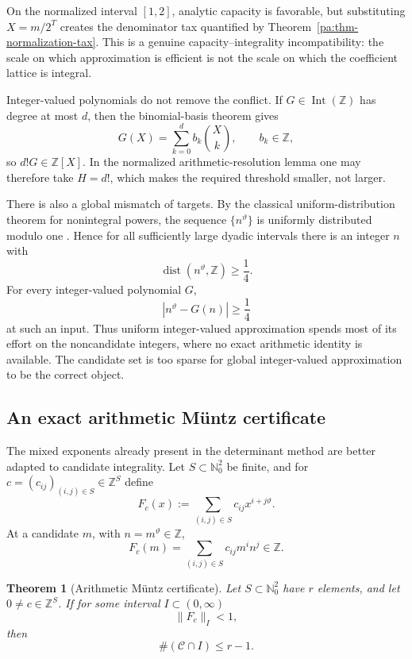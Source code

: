 \documentclass[11pt,oneside]{article}
\newtheorem{theorem}{Theorem}[section]
\theoremstyle{definition}
\theoremstyle{remark}
\newcommand{\Nzero}{\mathbb N_0}
\newcommand{\Z}{\mathbb Z}
\newcommand{\thetaq}{\vartheta}
\newcommand{\Cand}{\mathcal C}
\begin{document}
On the normalized interval \([1,2]\), analytic capacity is favorable, but substituting
\(X=m/2^T\) creates the denominator tax quantified by
Theorem~\ref{pa:thm-normalization-tax}.  This is a genuine capacity--integrality
incompatibility: the scale on which approximation is efficient is not the scale on which the
coefficient lattice is integral.

Integer-valued polynomials do not remove the conflict.  If
\(G\in\operatorname{Int}(\Z)\) has degree at most \(d\), then the binomial-basis theorem gives
\begin{equation}
 G(X)=\sum_{k=0}^{d}b_k\binom{X}{k},
 \qquad b_k\in\Z,
 \label{pa:eq-intZ-binomial}
\end{equation}
so \(d!G\in\Z[X]\).  In the normalized arithmetic-resolution lemma one may therefore take
\(H=d!\), which makes the required threshold smaller, not larger.

There is also a global mismatch of targets.  By the classical uniform-distribution theorem
for nonintegral powers, the sequence \(\{n^{\thetaq}\}\) is uniformly distributed modulo one
\cite{KuipersNiederreiter}.  Hence for all sufficiently large dyadic intervals there is an
integer \(n\) with
\[
 \operatorname{dist}(n^{\thetaq},\Z)\ge\frac14.
\]
For every integer-valued polynomial \(G\),
\[
 |n^{\thetaq}-G(n)|\ge\frac14
\]
at such an input.  Thus uniform integer-valued approximation spends most of its effort on the
noncandidate integers, where no exact arithmetic identity is available.  The candidate set is
too sparse for global integer-valued approximation to be the correct object.

\subsection{An exact arithmetic M\"untz certificate}

The mixed exponents already present in the determinant method are better adapted to candidate
integrality.  Let \(S\subset\Nzero^2\) be finite, and for
\(c=(c_{ij})_{(i,j)\in S}\in\Z^S\) define
\begin{equation}
 F_c(x):=\sum_{(i,j)\in S}c_{ij}x^{i+j\thetaq}.
 \label{pa:eq-muntz-polynomial}
\end{equation}
At a candidate \(m\), with \(n=m^{\thetaq}\in\Z\),
\begin{equation}
 F_c(m)=\sum_{(i,j)\in S}c_{ij}m^in^j\in\Z.
 \label{pa:eq-muntz-integrality}
\end{equation}

\begin{theorem}[Arithmetic M\"untz certificate]
\label{pa:thm-muntz-certificate}
Let \(S\subset\Nzero^2\) have \(r\) elements, and let
\(0\ne c\in\Z^S\).  If for some interval \(I\subset(0,\infty)\)
\begin{equation}
 \|F_c\|_I<1,
 \label{pa:eq-muntz-small}
\end{equation}
then
\begin{equation}
 \#(\Cand\cap I)\le r-1.
 \label{pa:eq-muntz-count}
\end{equation}
\end{theorem}
\end{document}

